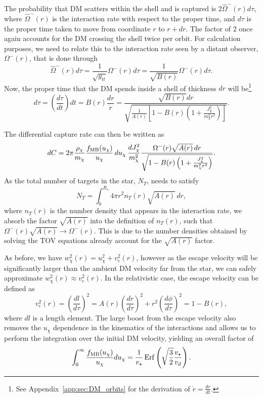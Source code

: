 The probability that DM scatters within the shell and is captured is $2\hat{\Omega}^-(r) d\tau$,
where $\hat{\Omega}^-(r)$ is the interaction rate with respect to the proper time, and $d\tau$ is the proper time taken to move from coordinate $r$ to $r + dr$. The factor of 2 once again accounts for the DM crossing the shell twice per orbit. For calculation purposes, we need to relate this to the interaction rate seen by a distant observer, $\Omega^-(r)$, that is done through
\begin{equation}
    \hat{\Omega}^-(r) d\tau = \frac{1}{\sqrt{g_{tt}}}\Omega^-(r)d\tau= \frac{1}{\sqrt{B(r)}}\Omega^-(r)d\tau.
\end{equation}
Now, the proper time that the DM spends inside a shell of thickness $dr$ will be\footnote{See Appendix~\ref{app:sec:DM_orbits} for the derivation of $\dot r = \frac{dr}{dt}$.}
\begin{equation}
    d\tau = \left( \frac{d\tau}{dt}\right) dt = B(r) \frac{dr}{\dot r} = \frac{\sqrt{B(r)} dr}{\sqrt{\frac{1}{A(r)} \left[ 1 - B(r)\left( 1 + \frac{J_\chi^2}{m_\chi^2 r^2} \right) \right]}}.
\end{equation}

The differential capture rate can then be written as 
\begin{equation}
    dC =  2\pi  \frac{\rho_\chi}{m_\chi}\frac{f_{\rm MB}(u_\chi)}{u_\chi}\,du_\chi\,\frac{dJ^2_\chi}{m_\chi^2} \frac{\Omega^-(r)\sqrt{A(r)} \,dr}{\sqrt{1 - B(r)\left( 1 + \frac{J_\chi^2}{m_\chi^2 r^2} \right)}}.
\end{equation}
As the total number of targets in the star, $N_T$, needs to satisfy
\begin{equation}
    N_T = \int_0^{R_\star} 4\pi r^2 n_T(r)\sqrt{A(r)}\,dr,
\end{equation}
where $n_T(r)$ is the number density that appears in the interaction rate, we absorb the factor $\sqrt{A(r)}$ into the definition of $n_T(r)$, such that $\Omega^-(r)\sqrt{A(r)}\rightarrow \Omega^-(r)$. This is due to the number densities obtained by solving the TOV equations already account for the $\sqrt{A(r)}$ factor. 

As before, we have $w_\chi^2(r) = u_\chi^2 + v_e^2(r)$, however as the escape velocity will be significantly larger than the ambient DM velocity far from the star, we can safely approximate $w_\chi^2(r)\approx v_e^2(r)$. 
In the relativistic case, the escape velocity can be defined as
\begin{equation}
    v_e^2(r) = \left(\frac{dl}{d\tau}\right)^2 = A(r) \left(\frac{dr}{d\tau}\right)^2 + r^2 \left(\frac{d\phi}{d\tau}\right)^2 = 1 - B(r),
    \label{ch3:eq:vesceq}
\end{equation}
where $dl$ is a length element. 
The large boost from the escape velocity also removes the $u_\chi$ dependence in the kinematics of the interactions and allows us to perform the integration over the initial DM velocity, yielding an overall factor of
\begin{equation}
    \int_0^\infty \frac{f_{\rm MB}(u_\chi)}{u_\chi} du_\chi = \frac{1}{v_\star}{\rm \,Erf}\left(\sqrt{\frac{3}{2}}\frac{v_\star}{v_d}\right).
\end{equation}

